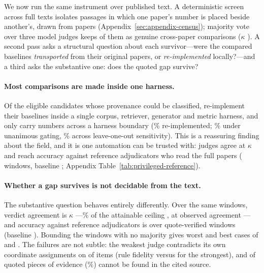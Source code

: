 We now run the same instrument over published text. A deterministic screen across
\FlowTexts{} full texts isolates \FrameCandidates{} passages in which one paper's number is
placed beside another's, drawn from \FrameFiles{} papers
(Appendix~\ref{sec:appendix-census}); majority vote over three model judges keeps
\CensusEligible{} of them as genuine cross-paper comparisons ($\kappa$ \DecEligK{}). A second
pass asks a structural question about each survivor---were the compared baselines
\emph{transported} from their original papers, or \emph{re-implemented} locally?---and a third
asks the substantive one: does the quoted gap survive?

\paragraph{Most comparisons are made inside one harness.}
Of the \ProvClassified{} eligible candidates whose provenance could be classified,
\ProvReimplemented{} re-implement their baselines inside a single corpus, retriever, generator
and metric harness, and only \ProvTransported{} carry numbers across a harness boundary
(\ProvReimplPct{}\% re-implemented; \GateUnanSharePct{}\% under unanimous gating,
\GateLooRangePct{}\% across leave-one-out sensitivity). This is a reassuring finding about the
field, and it is one automation can be trusted with: judges agree at $\kappa$ \DecProvK{} and
reach \DepPvAcc{} \DepPvCI{} accuracy against reference adjudicators who read the full papers
(\DepPvN{} windows, baseline \DepPvBase{}; Appendix Table~\ref{tab:privileged-reference}).

\paragraph{Whether a gap survives is not decidable from the text.}
The substantive question behaves entirely differently. Over the same \CensusEligible{} windows,
verdict agreement is $\kappa$ \DecVerdictK{}---\KShareVerdict{}\% of the attainable ceiling
\KmaxVerdict{}, at observed agreement \ObsVerdict{}---and accuracy against reference
adjudicators is \DepVdAcc{} \DepVdCI{} over \DepVdN{} quote-verified windows (baseline
\DepVdBase{}). Bounding the \RefVdNoMaj{} windows with no majority gives worst and best cases of
\BoundVdCommitWorst{} and \BoundVdCommitBest{}. The failures are not subtle: the weakest judge
contradicts its own coordinate assignments on \RuleContraWorst{} of \RuleContraWorstN{} items
(rule fidelity \RuleFidelityLo{} versus \RuleFidelityHi{} for the strongest), and \QFAbsent{} of
\QFNonEmpty{} quoted pieces of evidence (\QFAbsentPct{}\%) cannot be found in the cited source.

